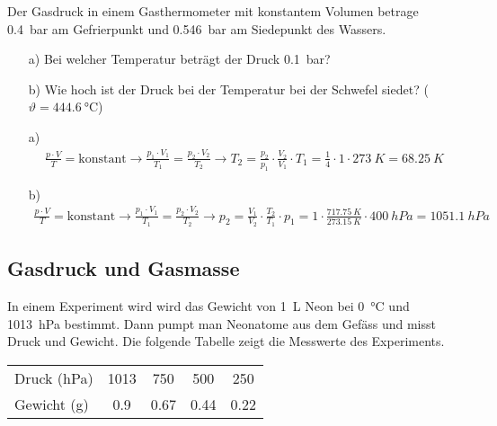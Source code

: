 \documentclass[12pt,a4paper,twoside]{article}
\begin{document}
\begin{aufgabe}
	Der Gasdruck in einem Gasthermometer mit konstantem Volumen betrage \SI{0.4}{bar} am Gefrierpunkt
	und \SI{0.546}{bar} am Siedepunkt des Wassers.
	\begin{itemize}
		\item [a)] Bei welcher Temperatur beträgt der Druck \SI{0.1}{bar}?
		\item [b)] Wie hoch ist der Druck bei der Temperatur bei der Schwefel siedet? ($\vartheta=\SI{444.6}{\celsius}$)
	\end{itemize}
	\begin{loesung}
		\begin{itemize}
			\item [a)]
				\begin{eqnarray*}
					\frac{p\cdot V}{T}=\text{konstant}\to\frac{p_1\cdot V_1}{T_1}=\frac{p_2\cdot V_2}{T_2}\to T_2=\frac{p_2}{p_1}\cdot\frac{V_2}{V_1}\cdot T_1 =\frac{1}{4}\cdot 1\cdot \SI{273}{K}=\SI{68.25}{K} 
				\end{eqnarray*}
			\item[b)]
				\begin{eqnarray*}
					\frac{p\cdot V}{T}=\text{konstant}\to\frac{p_1\cdot V_1}{T_1}=\frac{p_2\cdot V_2}{T_2}\to p_2=\frac{V_1}{V_2}\cdot\frac{T_2}{T_1}\cdot p_1=1\cdot\frac{\SI{717.75}{K}}{\SI{273.15}{K}}\cdot\SI{400}{hPa}=\SI{1051.1}{hPa} 
				\end{eqnarray*}
		\end{itemize}
	\end{loesung}
\end{aufgabe}


\subsection*{Gasdruck und Gasmasse}
In einem Experiment wird wird das Gewicht von \SI{1}{L} Neon bei \SI{0}{\celsius} und \SI{1013}{hPa} bestimmt.
Dann pumpt man Neonatome aus dem Gefäss und misst Druck und Gewicht.
Die folgende Tabelle zeigt die Messwerte des Experiments.

\begin{center}
\begin{tabular}{lcccc}
	Druck (hPa)      & 1013      & 750        & 500        & 250 \\
	Gewicht (g)      & \num{0.9} & \num{0.67} & \num{0.44} & \num{0.22} \\
\end{tabular}
\end{center}
\end{document}
